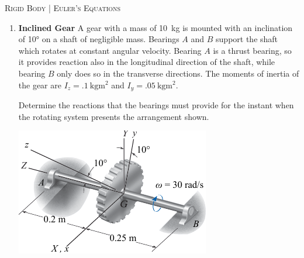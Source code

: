 \documentclass[11pt, english, a4paper, twoside]{article}
\begin{document}
\begin{center}
  \textsc{\large Rigid Body | Euler's Equations}
\end{center}


\begin{enumerate}

	\item 
	\begin{minipage}[t][5cm]{0.55\textwidth}
		\textbf{Inclined Gear}
		A gear with a mass of \SI{10}{\kilo\gram} is mounted with an inclination of \ang{10;;} on a shaft of negligible mass.
		Bearings \(A\) and \(B\) support the shaft which rotates at constant angular velocity.
		Bearing \(A\) is a thrust bearing, so it provides reaction also in the longitudinal direction of the shaft, while bearing \(B\) only does so in the transverse directions.
		The moments of inertia of the gear are \(I_z = \SI{.1}{\kilo\gram\metre\squared}\) and \(I_y = \SI{.05}{\kilo\gram\metre\squared}\).
		\begin{tasks} 
			\task Determine the reactions that the bearings must provide for the instant when the rotating system presents the arrangement shown.
		\end{tasks}
	\end{minipage}
	\begin{minipage}[c][0.5cm][t]{0.4\textwidth}
		\includegraphics[width=\textwidth]{figures/hibb_21-4}
	\end{minipage}



\end{enumerate}
\end{document}

